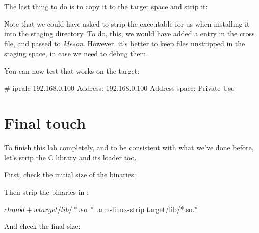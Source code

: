 The last thing to do is to copy it to the target space and strip it:


Note that we could have asked  to strip the
executable for us when installing it into the staging directory.
To do, this, we would have added a  entry in the cross file,
and passed  to {\em Meson}. However, it's better to keep
files unstripped in the staging space, in case we need to debug them.

You can now test that  works on the target:

\begin{bashinput}
# ipcalc 192.168.0.100
Address:	192.168.0.100
Address space:	Private Use
\end{bashinput}

\section{Final touch}

To finish this lab completely, and to be consistent with what we've done before,
let's strip the C library and its loader too.

First, check the initial size of the binaries:

Then strip the binaries in :
\begin{bashinput}
$ chmod +w target/lib/*.so.*
$ arm-linux-strip target/lib/*.so.*
\end{bashinput}

And check the final size:
